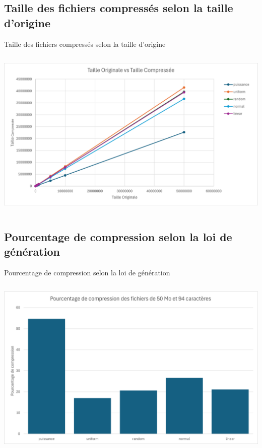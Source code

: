 \documentclass{beamer}
\begin{document}
\subsection*{Taille des fichiers compressés selon la taille d'origine}
\begin{frame}{Taille des fichiers compressés selon la taille d'origine}
    \begin{columns}[T]
        \begin{column}{0.9\textwidth}
            \includegraphics[width=\textwidth]{../assets/taille-originale-vs-compressee.png}
        \end{column}
    \end{columns}
\end{frame}


\subsection*{Pourcentage de compression selon la loi de génération}
\begin{frame}{Pourcentage de compression selon la loi de génération}
    \begin{columns}[T]
        \begin{column}{0.9\textwidth}
            \includegraphics[width=\textwidth]{../assets/pourcentage-de-compression.png}
        \end{column}
    \end{columns}
\end{frame}
\end{document}
